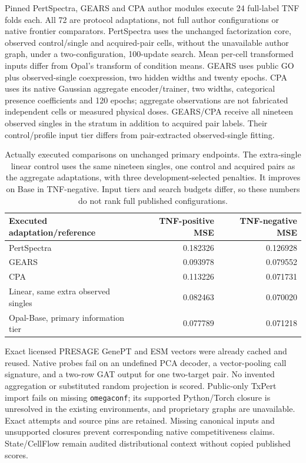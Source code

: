 Pinned PertSpectra, GEARS and CPA author modules execute 24 full-label TNF folds each. All 72 are protocol adaptations, not full author configurations or native frontier comparators. PertSpectra uses the unchanged factorization core, observed control/single and acquired-pair cells, without the unavailable author graph, under a two-configuration, 100-update search. Mean per-cell transformed inputs differ from Opal's transform of condition means. GEARS uses public GO plus observed-single coexpression, two hidden widths and twenty epochs. CPA uses its native Gaussian aggregate encoder/trainer, two widths, categorical presence coefficients and 120 epochs; aggregate observations are not fabricated independent cells or measured physical doses. GEARS/CPA receive all nineteen observed singles in the stratum in addition to acquired pair labels. Their control/profile input tier differs from pair-extracted observed-single fitting.

\begin{table}[htbp]\centering\small
\begin{tabular}{lrr}\toprule
Executed adaptation/reference & TNF-positive MSE & TNF-negative MSE \\\midrule
PertSpectra & 0.182326 & 0.126928 \\
GEARS & 0.093978 & 0.079552 \\
CPA & 0.113226 & 0.071731 \\
Linear, same extra observed singles & 0.082463 & 0.070020 \\
Opal-Base, primary information tier & 0.077789 & 0.071218 \\\bottomrule
\end{tabular}
\caption{Actually executed comparisons on unchanged primary endpoints. The extra-single linear control uses the same nineteen singles, one control and acquired pairs as the aggregate adaptations, with three development-selected penalties. It improves on Base in TNF-negative. Input tiers and search budgets differ, so these numbers do not rank full published configurations.}
\end{table}

Exact licensed PRESAGE GenePT and ESM vectors were already cached and reused. Native probes fail on an undefined PCA decoder, a vector-pooling call signature, and a two-row GAT output for one two-target pair. No invented aggregation or substituted random projection is scored. Public-only TxPert import fails on missing \texttt{omegaconf}; its supported Python/Torch closure is unresolved in the existing environments, and proprietary graphs are unavailable. Exact attempts and source pins are retained. Missing canonical inputs and unsupported closures prevent corresponding native competitiveness claims. State/CellFlow remain audited distributional context without copied published scores.


